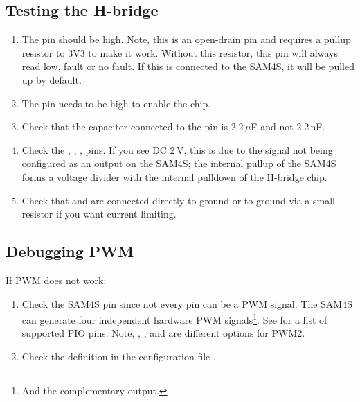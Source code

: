 \subsection{Testing the H-bridge}
\label{testing-the-h-bridge}

\begin{enumerate}
\item The  pin should be high.  Note, this is an
  open-drain pin and requires a pullup resistor to 3V3 to make it
  work.  Without this resistor, this pin will always read low, fault
  or no fault.  If this is connected to the SAM4S, it will be pulled
  up by default.

\item The  pin needs to be high to enable the chip.

\item Check that the capacitor connected to the  pin is
  2.2\,$\mu$F and not 2.2\,nF.

\item Check the , , ,  pins.
  If you see DC 2\,V, this is due to the signal not being configured
  as an output on the SAM4S; the internal pullup of the SAM4S forms a
  voltage divider with the internal pulldown of the H-bridge chip.

\item Check that  and  are connected
  directly to ground or to ground via a small resistor if you want
  current limiting.
\end{enumerate}


\subsection{Debugging PWM}
\label{debugging-pwm}

If PWM does not work:

\begin{enumerate}
\item
  Check the SAM4S pin since not every pin can be a PWM signal.  The
  SAM4S can generate four independent hardware PWM
  signals\footnote{And the complementary output.}. See
   for a list of supported PIO pins.  Note,
  , , and  are different options for
  PWM2.

\item
  Check the definition in the configuration file .
\end{enumerate}

